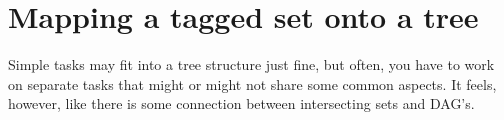 

\section{Mapping a tagged set onto a tree}
Simple tasks may fit into a tree structure just fine, but often, you have to work on separate tasks that might or might not share some common aspects. It feels, however, like there is some connection between intersecting sets and DAG's. 

